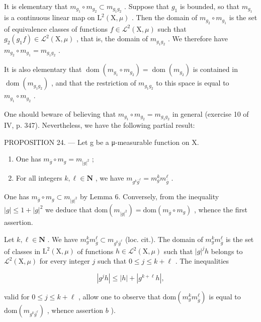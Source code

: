 It is elementary that \(m_{g_{1}} \circ m_{g_{2}} \subset m_{g_{1}g_{2}}\) . Suppose that \(g_{1}\) is bounded, so that \(m_{g_{1}}\) is a continuous linear map on \(\mathrm{L}^{2}(\mathrm{X},\mu)\) . Then the domain of \(m_{g_{2}} \circ m_{g_{1}}\) is the set of equivalence classes of functions \(f \in \mathcal{L}^{2}(\mathrm{X},\mu)\) such that \(g_{2}(g_{1}f) \in \mathcal{L}^{2}(\mathrm{X},\mu)\) , that is, the domain of \(m_{g_{1}g_{2}}\) . We therefore have \(m_{g_{2}} \circ m_{g_{1}} = m_{g_{1}g_{2}}\) .

It is also elementary that \(\operatorname{dom}(m_{g_{1}} \circ m_{g_{2}}) = \operatorname{dom}(m_{g_{2}})\) is contained in \(\operatorname{dom}(m_{g_{1}g_{2}})\) , and that the restriction of \(m_{g_{1}g_{2}}\) to this space is equal to \(m_{g_{1}} \circ m_{g_{2}}\) .

One should beware of believing that \(m_{g_{1}} \circ m_{g_{2}} = m_{g_{1}g_{2}}\) in general (exercise 10 of IV, p. 347). Nevertheless, we have the following partial result:

PROPOSITION 24. --- Let g be a μ-measurable function on X.

\begin{enumerate}
\def\labelenumi{\alph{enumi})}
\item
  One has \(m_{\overline{g}} \circ m_g = m_{|g|^2}\) ;
\item
  For all integers \(k, \ell \in \mathbf{N}\) , we have \(m_{g^k\overline{g}^\ell} = m_g^k m_{\overline{g}}^\ell\) .
\end{enumerate}

One has \(m_{\overline{g}} \circ m_g \subset m_{|g|^2}\) by Lemma 6. Conversely, from the inequality \(|g| \leqslant 1 + |g|^2\) we deduce that \(\text{dom}(m_{|g|^2}) = \text{dom}(m_{\overline{g}} \circ m_g)\) , whence the first assertion.

Let \(k, \ell \in \mathbf{N}\) . We have \(m_g^k m_{\overline{g}}^\ell \subset m_{g^k \overline{g}^\ell}\) (loc. cit.). The domain of \(m_g^k m_{\overline{g}}^\ell\) is the set of classes in \(\mathrm{L}^2(\mathrm{X}, \mu)\) of functions \(h \in \mathcal{L}^2(\mathrm{X}, \mu)\) such that \(|g|^j h\) belongs to \(\mathcal{L}^2(\mathrm{X}, \mu)\) for every integer \(j\) such that \(0 \leqslant j \leqslant k + \ell\) . The inequalities

\[
\left| g ^ {j} h \right| \leqslant | h | + \left| g ^ {k + \ell} h \right|,
\]

valid for \(0 \leqslant j \leqslant k + \ell\) , allow one to observe that \(\mathrm{dom}(m_g^k m_{\overline{g}}^\ell)\) is equal to \(\mathrm{dom}(m_{g^k\overline{g}^\ell})\) , whence assertion \(b\) ).

